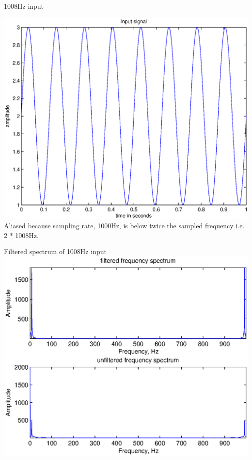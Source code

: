 \documentclass[mathserif]{beamer}
\begin{document}
    
    \begin{frame}{1008Hz input}
      \begin{minipage}[t][0.8\textheight][t]{\textwidth}
	\includegraphics[width=\linewidth]{inputSig1008Hz} \\
	\vfill
	\tiny{Aliased because sampling rate, 1000Hz, is below twice the sampled frequency i.e. 2 * 1008Hz.}
      \end{minipage}
    \end{frame}

    
    \begin{frame}{Filtered spectrum of 1008Hz input}
      \includegraphics[width=\linewidth]{freqSpec1008Hz}
    \end{frame}
\end{document}
